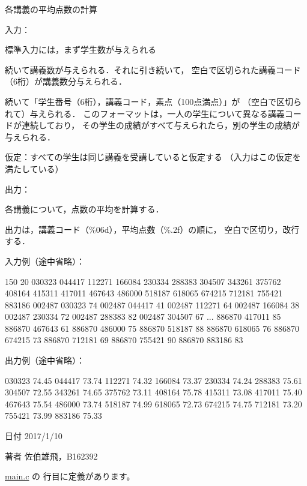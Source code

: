 各講義の平均点数の計算 

入力：
\begin{DoxyItemize}
\item 標準入力には，まず学生数が与えられる
\item 続いて講義数が与えられる．それに引き続いて， 空白で区切られた講義コード（6桁）が講義数分与えられる．
\item 続いて「学生番号（6桁），講義コード，素点（100点満点）」が （空白で区切られて）与えられる． このフォーマットは，一人の学生について異なる講義コードが連続しており， その学生の成績がすべて与えられたら，別の学生の成績が与えられる．
\item 仮定：すべての学生は同じ講義を受講していると仮定する （入力はこの仮定を満たしている）
\end{DoxyItemize}

出力：
\begin{DoxyItemize}
\item 各講義について，点数の平均を計算する．
\item 出力は，講義コード（\%06d），平均点数（\%.2f）の順に， 空白で区切り，改行する．
\end{DoxyItemize}

入力例（途中省略）： \begin{DoxyVerb}150
20
030323 044417 112271 166084 230334 288383 304507 343261 375762 408164 415311
417011 467643 486000 518187 618065 674215 712181 755421 883186
002487 030323 74
002487 044417 41
002487 112271 64
002487 166084 38
002487 230334 72
002487 288383 82
002487 304507 67
...
886870 417011 85
886870 467643 61
886870 486000 75
886870 518187 88
886870 618065 76
886870 674215 73
886870 712181 69
886870 755421 90
886870 883186 83
\end{DoxyVerb}
 出力例（途中省略）： \begin{DoxyVerb}030323 74.45
044417 73.74
112271 74.32
166084 73.37
230334 74.24
288383 75.61
304507 72.55
343261 74.65
375762 73.11
408164 75.78
415311 73.08
417011 75.40
467643 75.54
486000 73.74
518187 74.99
618065 72.73
674215 74.75
712181 73.20
755421 73.99
883186 75.33
\end{DoxyVerb}
 \begin{DoxyDate}{日付}
2017/1/10 
\end{DoxyDate}
\begin{DoxyAuthor}{著者}
佐伯雄飛，\-B162392 
\end{DoxyAuthor}


 \hyperlink{main_8c_source}{main.\-c} の  行目に定義があります。


